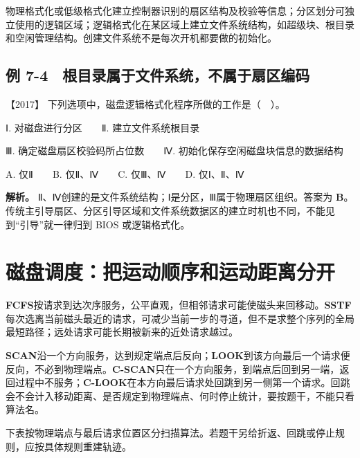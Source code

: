 物理格式化或低级格式化建立控制器识别的扇区结构及校验等信息；分区划分可独立使用的逻辑区域；逻辑格式化在某区域上建立文件系统结构，如超级块、根目录和空闲管理结构。创建文件系统不是每次开机都要做的初始化。

\subsection{例 7-4　根目录属于文件系统，不属于扇区编码}\label{os-ex7-4}

\noindent{}【2017】 下列选项中，磁盘逻辑格式化程序所做的工作是（　）。

Ⅰ. 对磁盘进行分区　　Ⅱ. 建立文件系统根目录

Ⅲ. 确定磁盘扇区校验码所占位数　　Ⅳ. 初始化保存空闲磁盘块信息的数据结构

A. 仅Ⅱ　　B. 仅Ⅱ、Ⅳ　　C. 仅Ⅲ、Ⅳ　　D. 仅Ⅰ、Ⅱ、Ⅳ


\textbf{解析。} Ⅱ、Ⅳ创建的是文件系统结构；Ⅰ是分区，Ⅲ属于物理扇区组织。答案为 \textbf{B}。传统主引导扇区、分区引导区域和文件系统数据区的建立时机也不同，不能见到``引导''就一律归到 BIOS 或逻辑格式化。

\section{磁盘调度：把运动顺序和运动距离分开}\label{os-7-9}

\textbf{FCFS}按请求到达次序服务，公平直观，但相邻请求可能使磁头来回移动。\textbf{SSTF}每次选离当前磁头最近的请求，可减少当前一步的寻道，但不是求整个序列的全局最短路径；远处请求可能长期被新来的近处请求越过。

\textbf{SCAN}沿一个方向服务，达到规定端点后反向；\textbf{LOOK}到该方向最后一个请求便反向，不必到物理端点。\textbf{C-SCAN}只在一个方向服务，到端点后回到另一端，返回过程中不服务；\textbf{C-LOOK}在本方向最后请求处回跳到另一侧第一个请求。回跳会不会计入移动距离、是否规定到物理端点、何时停止统计，要按题干，不能只看算法名。

下表按物理端点与最后请求位置区分扫描算法。若题干另给折返、回跳或停止规则，应按具体规则重建轨迹。

